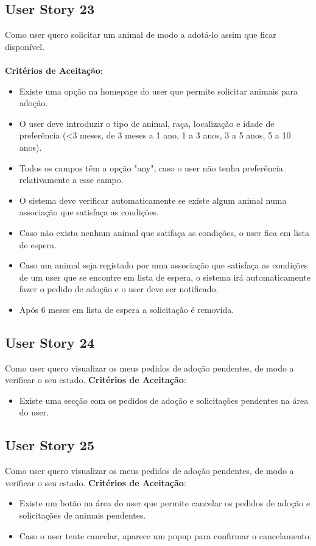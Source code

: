 \documentclass[a4paper,11pt]{article}
\begin{document}
\subsection{User Story 23}
Como user quero solicitar um animal de modo a adotá-lo assim que ficar disponível.\\\\
\textbf{Critérios de Aceitação}:
\begin{itemize}
  \item Existe uma opção na homepage do user que permite solicitar animais para adoção.
  \item O user deve introduzir o tipo de animal, raça, localização e idade de preferência (<3 meses, de 3 meses a 1 ano, 1 a 3 anos, 3 a 5 anos, 5 a 10 anos).
  \item Todos os campos têm a opção "any", caso o user não tenha preferência relativamente a esse campo.
  \item O sistema deve verificar automaticamente se existe algum animal numa associação que satisfaça as condições.
  \item Caso não exista nenhum animal que satifaça as condições, o user fica em lista de espera.
  \item Caso um animal seja registado por uma associação que satisfaça as condições de um user que se encontre em lista de espera, o sistema irá automaticamente fazer o pedido de adoção e o user deve ser notificado.
  \item Após 6 meses em lista de espera a solicitação é removida.
\end{itemize}

\subsection{User Story 24}
Como user quero visualizar os meus pedidos de adoção pendentes, de modo a verificar o seu estado.
\textbf{Critérios de Aceitação}:
\begin{itemize}
  \item Existe uma secção com os pedidos de adoção e solicitações pendentes na área do user.
\end{itemize}

\subsection{User Story 25}
Como user quero visualizar os meus pedidos de adoção pendentes, de modo a verificar o seu estado.
\textbf{Critérios de Aceitação}:
\begin{itemize}
  \item Existe um botão na área do user que permite cancelar os pedidos de adoção e solicitações de animais pendentes.
  \item Caso o user tente cancelar, aparece um popup para confirmar o cancelamento.
\end{itemize}
\end{document}
